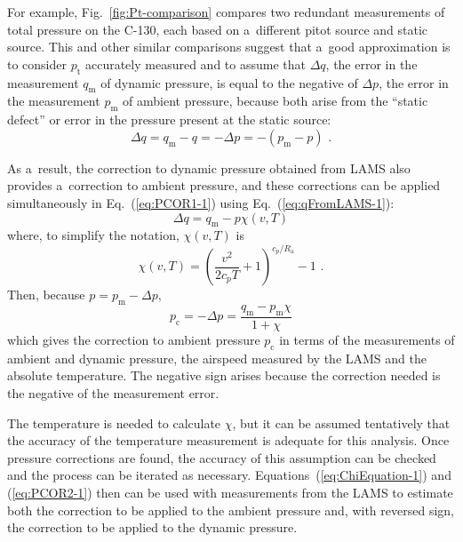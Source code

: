 \documentclass[amtd, online, hvmath]{copernicus}
\begin{document}
For example, Fig.~\ref{fig:Pt-comparison} compares two redundant
measurements of total pressure on the C-130, each based on a~different
pitot source and static source. This and other similar comparisons
suggest that a~good approximation is to consider $p_{\mathrm{t}}$ accurately
measured and to assume that $\Delta q$, the error in the measurement
$q_{\mathrm{m}}$ of dynamic pressure, is equal to the negative of $\Delta p$,
the error in the measurement $p_{\mathrm{m}}$ of ambient pressure, because
both arise from the ``static defect'' or error in the pressure present
at the static source:
\begin{equation}
\Delta q=q_{\mathrm{m}}-q=-\Delta p=-(p_{\mathrm{m}}-p)\,\,.\label{eq:PCOR1-1}
\end{equation}

As a~result, the correction to dynamic pressure obtained from LAMS
also provides a~correction to ambient pressure, and these corrections
can be applied simultaneously in Eq.~(\ref{eq:PCOR1-1}) using
Eq.~(\ref{eq:qFromLAMS-1}):
\begin{equation*}
\Delta q=q_{\mathrm{m}}-p\chi(v,T)
\end{equation*}
where, to simplify the notation, $\chi(v,T)$ is
\begin{equation}
\chi(v,T)=\left(\frac{v^2}{2c_pT}+1\right)^{c_p/R_{\mathrm{a}}}-1\,\,.\label{eq:ChiEquation-1}
\end{equation}
Then, because $p=p_{\mathrm{m}}-\Delta p,$
\begin{equation}
p_{\mathrm{c}}=-\Delta p=\frac{q_{\mathrm{m}}-p_{\mathrm{m}}\chi}{1+\chi}\label{eq:PCOR2-1}
\end{equation}
which gives the correction to ambient pressure $p_{\mathrm{c}}$ in
terms of the measurements of ambient and dynamic pressure, the
airspeed measured by the LAMS and the absolute temperature. The
negative sign arises because the correction needed is the negative of
the measurement error.

The temperature is needed to calculate $\chi$, but it can be assumed
tentatively that the accuracy of the temperature measurement is
adequate for this analysis. Once pressure corrections are found, the
accuracy of this assumption can be checked and the process can be
iterated as necessary. Equations~(\ref{eq:ChiEquation-1}) and
(\ref{eq:PCOR2-1}) then can be used with measurements from the LAMS to
estimate both the correction to be applied to the ambient pressure
and, with reversed sign, the correction to be applied to the dynamic
pressure.
\end{document}
